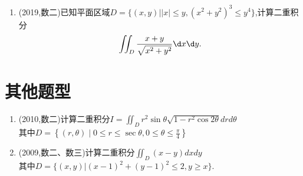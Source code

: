 \documentclass[12pt, a4paper, oneside, UTF8]{ctexbook}
\begin{document}
\begin{enumerate}[label=\arabic*.,start=6]
    \begin{solution}
    \newpage
    \end{solution}
    
    \item (2019,数二)已知平面区域$D=\{(x,y)||x|\leq y,(x^2+y^2)^3\leq y^4\}$,计算二重积分
    \begin{align*}
        \iint_D\frac{x+y}{\sqrt{x^2+y^2}}\d x\d y.
    \end{align*}
    
    \begin{solution}
    \newpage
    \end{solution}
\end{enumerate}

\section{其他题型}

\begin{enumerate}[label=\arabic*.,start=12]
    \item (2010,数二)计算二重积分$\displaystyle I=\iint_D r^2\sin\theta\sqrt{1-r^2\cos 2\theta} drd\theta$ \\
    其中$\displaystyle D=\left\{(r,\theta)\mid 0\leq r\leq\sec{\theta},0\leq\theta\leq\frac{\pi}{4}\right\}$
    
    \begin{solution}
    \newpage
    \end{solution}
    
    \item (2009,数二、数三)计算二重积分$\iint_D(x-y)dxdy$\\
    其中$\displaystyle D=\{(x,y)|(x-1)^2+(y-1)^2\leq 2,y\geq x\}$.
    
    \begin{solution}
    \newpage
    \end{solution}
\end{enumerate}

\ifx\allfiles\undefined
\end{document}
